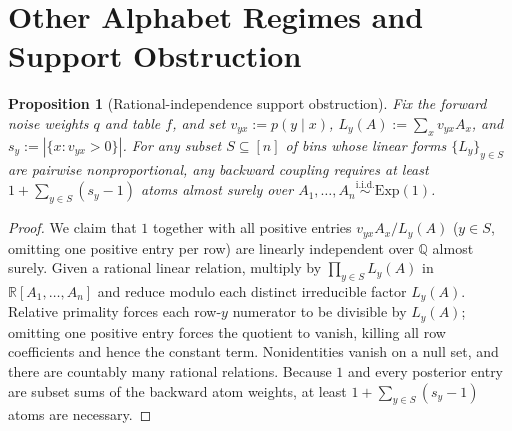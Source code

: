\documentclass[11pt]{article}
\theoremstyle{plain}
\newtheorem{proposition}[theorem]{Proposition}
\theoremstyle{definition}
\theoremstyle{remark}
\begin{document}
\section{Other Alphabet Regimes and Support Obstruction}

\begin{proposition}[Rational-independence support obstruction]\label{prop:obstruction}
Fix the forward noise weights $q$ and table $f$, and set $v_{yx} := p(y \mid x)$, $L_y(A) := \sum_x v_{yx} A_x$, and $s_y := |\{x : v_{yx} > 0\}|$. For any subset $S \subseteq [n]$ of bins whose linear forms $\{L_y\}_{y \in S}$ are pairwise nonproportional, any backward coupling requires at least $1 + \sum_{y \in S}(s_y - 1)$ atoms almost surely over $A_1, \dots, A_n \stackrel{\mathrm{i.i.d.}}{\sim} \mathrm{Exp}(1)$.
\end{proposition}

\begin{proof}
We claim that $1$ together with all positive entries $v_{yx} A_x / L_y(A)$ ($y \in S$, omitting one positive entry per row) are linearly independent over $\mathbb{Q}$ almost surely. Given a rational linear relation, multiply by $\prod_{y \in S} L_y(A)$ in $\mathbb{R}[A_1, \dots, A_n]$ and reduce modulo each distinct irreducible factor $L_y(A)$. Relative primality forces each row-$y$ numerator to be divisible by $L_y(A)$; omitting one positive entry forces the quotient to vanish, killing all row coefficients and hence the constant term. Nonidentities vanish on a null set, and there are countably many rational relations. Because $1$ and every posterior entry are subset sums of the backward atom weights, at least $1 + \sum_{y \in S}(s_y - 1)$ atoms are necessary.
\end{proof}
\end{document}
